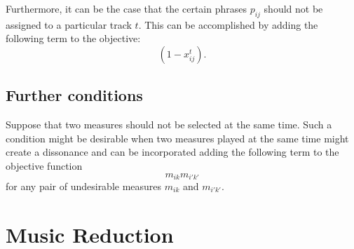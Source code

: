 \documentclass[11pt,a4paper]{article}
\begin{document}
 Furthermore, it can be the case that the certain phrases $ p_{ij} $ should not be assigned to a particular track $ t $. This can be accomplished by adding the following term to the objective:
 \begin{equation}
 (1-x_{ij}^t).
 \end{equation} 
 
 \subsection{Further conditions}
 Suppose that two measures should not be selected at the same time. Such a condition might be desirable when two measures played at the same time might create a dissonance and can be incorporated adding the following term to the objective function
 \begin{equation}
 m_{ik}m_{i'k'}
 \end{equation}  
for any pair of undesirable measures $m_{ik}$ and $ m_{i'k'} $. 

\section{Music Reduction}


\end{document}
